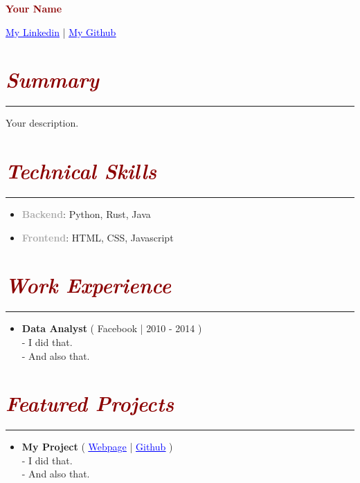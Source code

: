 \documentclass[11pt,a4paper]{article}
\newcommand{\customsection}[1]{
    \section*{\textcolor{darkred}{{{\textbf{\textit{#1}}}}}}

    \vspace{-2em}
    \textcolor{darkred}{\rule{\textwidth}{0.4pt}}

}
\begin{document}
\pagestyle{empty}

\centerline{\textcolor{darkred}{\textbf{\huge Your Name}}}

\bigskip

\centerline{\faLinkedin \hspace{0.1cm} \href{https://www.linkedin.com/in/example/}{\textcolor{blue}{\underline{My Linkedin}}} | \faGithub \hspace{0.1cm} \href{https://github.com/example}{\textcolor{blue}{\underline{My Github}}}}

\customsection{Summary}

\vspace{1.5em}

Your description.

\customsection{Technical Skills}

\begin{itemize}[label=$\bullet$, leftmargin=*]
	\item \textcolor{darkgray}{\textbf{Backend}}: Python, Rust, Java
	\item \textcolor{darkgray}{\textbf{Frontend}}: HTML, CSS, Javascript
\end{itemize}

\customsection{Work Experience}

\begin{itemize}[leftmargin=*]
	\item \textcolor{darkpurple}{\textbf{Data Analyst}} ( \faInstitution \hspace{0.05cm} Facebook | \faCalendar \hspace{0.1cm} 2010 - 2014 )\vspace{0.5em} \\
- I did that. \\
	- And also that.
\end{itemize}

\customsection{Featured Projects}

\begin{itemize}[label=$\bullet$, leftmargin=*]
	\item \textcolor{darkbrown}{\textbf{My Project}} ( \faGlobe \hspace{0.1cm} \href{https://www.mypage.com/example/}{\textcolor{blue}{\underline{Webpage}}}  | \faGithub \hspace{0.1cm} \href{https://github.com/name/myproject}{\textcolor{blue}{\underline{Github}}} )\vspace{0.5em} \\
	- I did that. \\
	- And also that.
\end{itemize}
\end{document}
